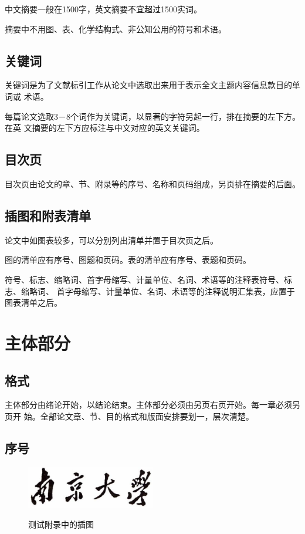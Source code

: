 \documentclass[master]{njuthesis}
\begin{document}
中文摘要一般在1500字，英文摘要不宜超过1500实词。

摘要中不用图、表、化学结构式、非公知公用的符号和术语。

\subsection{关键词}

关键词是为了文献标引工作从论文中选取出来用于表示全文主题内容信息款目的单词或
术语。

每篇论文选取3－8个词作为关键词，以显著的字符另起一行，排在摘要的左下方。在英
文摘要的左下方应标注与中文对应的英文关键词。

\subsection{目次页}

目次页由论文的章、节、附录等的序号、名称和页码组成，另页排在摘要的后面。

\subsection{插图和附表清单}

论文中如图表较多，可以分别列出清单并置于目次页之后。

图的清单应有序号、图题和页码。表的清单应有序号、表题和页码。

符号、标志、缩略词、首字母缩写、计量单位、名词、术语等的注释表符号、标志、缩略词、
首字母缩写、计量单位、名词、术语等的注释说明汇集表，应置于图表清单之后。

\section{主体部分}

\subsection{格式}

主体部分由绪论开始，以结论结束。主体部分必须由另页右页开始。每一章必须另页开
始。全部论文章、节、目的格式和版面安排要划一，层次清楚。

\subsection{序号}

\begin{figure}[htbp]
  \centering
  \includegraphics[width= 0.5\textwidth]{njuname.eps}\\
  \caption{测试附录中的插图}\label{fig:appendix1}
\end{figure}
\end{document}
